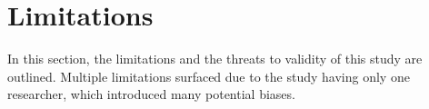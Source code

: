




\section{Limitations}
In this section, the limitations and the threats to validity of this study are outlined. Multiple limitations surfaced due to the study having only one researcher, which introduced many potential biases.

